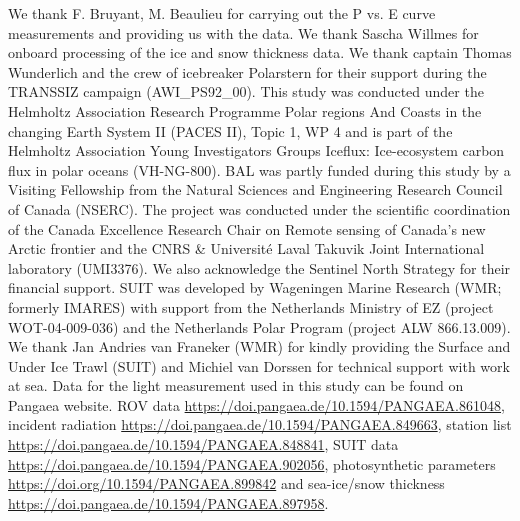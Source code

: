 \documentclass[draft]{agujournal2018}
\begin{document}
We thank F. Bruyant, M. Beaulieu for carrying out the P vs. E curve measurements and providing us with the data. We thank Sascha Willmes for onboard processing of the ice and snow thickness data. We thank captain Thomas Wunderlich and the crew of icebreaker Polarstern for their support during the TRANSSIZ campaign (AWI\_PS92\_00). This study was conducted under the Helmholtz Association Research Programme Polar regions And Coasts in the changing Earth System II (PACES II), Topic 1, WP 4 and is part of the Helmholtz Association Young Investigators Groups Iceflux: Ice-ecosystem carbon flux in polar oceans (VH-NG-800). BAL was partly funded during this study by a Visiting Fellowship from the Natural Sciences and Engineering Research Council of Canada (NSERC). The project was conducted under the scientific coordination of the Canada Excellence Research Chair on Remote sensing of Canada's new Arctic frontier and the CNRS \& Université Laval Takuvik Joint International laboratory (UMI3376). We also acknowledge the Sentinel North Strategy for their financial support. SUIT was developed by Wageningen Marine Research (WMR; formerly IMARES) with support from the Netherlands Ministry of EZ (project WOT-04-009-036) and the Netherlands Polar Program (project ALW 866.13.009). We thank Jan Andries van Franeker (WMR) for kindly providing the Surface and Under Ice Trawl (SUIT) and Michiel van Dorssen for technical support with work at sea. Data for the light measurement used in this study can be found on Pangaea website. ROV data \url{https://doi.pangaea.de/10.1594/PANGAEA.861048}, incident radiation \url{https://doi.pangaea.de/10.1594/PANGAEA.849663}, station list \url{https://doi.pangaea.de/10.1594/PANGAEA.848841}, SUIT data \url{https://doi.pangaea.de/10.1594/PANGAEA.902056}, photosynthetic parameters \url{https://doi.org/10.1594/PANGAEA.899842} and sea-ice/snow thickness \url{https://doi.pangaea.de/10.1594/PANGAEA.897958}.


%

\end{document}

